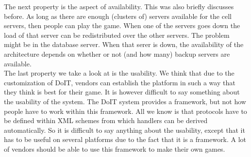 \indent The next property is the aspect of availability. This was also briefly discusses before. As long as there are enough (clusters of) servers available for the cell servers, then people can play the game. When one of the servers goes down the load of that server can be redistributed over the other servers. The problem might be in the database server. When that serer is down, the availability of the architecture depends on whether or not (and how many) backup servers are available.\\
The last property we take a look at is the usability. We think that due to the customization of DoIT, vendors can establish the platform in such a way that they think is best for their game. It is however difficult to say something about the usability of the system. The DoIT system provides a framework, but not how people have to work within this framework. All we know is that protocols have to be defined within XML schemes from which handlers can be derived automatically. So it is difficult to say anything about the usability, except that it has to be useful on several platforms due to the fact that it is a framework. A lot of vendors should be able to use this framework to make their own games.\\


